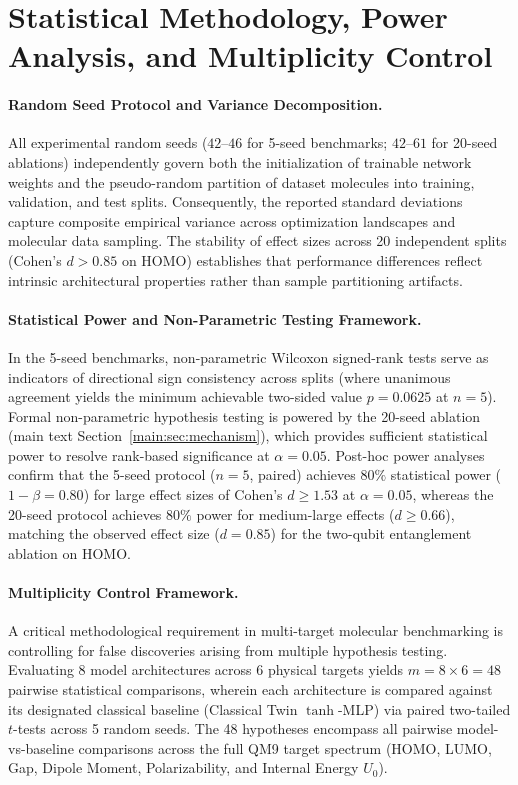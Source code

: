 \documentclass[10pt,twocolumn,letterpaper]{article}
\begin{document}
\section{Statistical Methodology, Power Analysis, and Multiplicity Control}
\label{sm:fdr}
\label{sm:seed_protocol}
\label{sec:sm_fdr_table}

\paragraph{Random Seed Protocol and Variance Decomposition.}
All experimental random seeds ($42$--$46$ for 5-seed benchmarks; $42$--$61$ for 20-seed ablations) independently govern both the initialization of trainable network weights and the pseudo-random partition of dataset molecules into training, validation, and test splits. Consequently, the reported standard deviations capture composite empirical variance across optimization landscapes and molecular data sampling. The stability of effect sizes across 20 independent splits (Cohen's $d > 0.85$ on HOMO) establishes that performance differences reflect intrinsic architectural properties rather than sample partitioning artifacts.

\paragraph{Statistical Power and Non-Parametric Testing Framework.}
In the 5-seed benchmarks, non-parametric Wilcoxon signed-rank tests serve as indicators of directional sign consistency across splits (where unanimous agreement yields the minimum achievable two-sided value $p = 0.0625$ at $n=5$). Formal non-parametric hypothesis testing is powered by the 20-seed ablation (main text Section~\ref{main:sec:mechanism}), which provides sufficient statistical power to resolve rank-based significance at $\alpha = 0.05$. Post-hoc power analyses confirm that the 5-seed protocol ($n = 5$, paired) achieves $80\%$ statistical power ($1-\beta = 0.80$) for large effect sizes of Cohen's $d \ge 1.53$ at $\alpha = 0.05$, whereas the 20-seed protocol achieves $80\%$ power for medium-large effects ($d \ge 0.66$), matching the observed effect size ($d = 0.85$) for the two-qubit entanglement ablation on HOMO.

\paragraph{Multiplicity Control Framework.}
A critical methodological requirement in multi-target molecular benchmarking is controlling for false discoveries arising from multiple hypothesis testing. Evaluating 8 model architectures across 6 physical targets yields $m = 8 \times 6 = 48$ pairwise statistical comparisons, wherein each architecture is compared against its designated classical baseline (Classical Twin $\tanh$-MLP) via paired two-tailed $t$-tests across 5 random seeds. The 48 hypotheses encompass all pairwise model-vs-baseline comparisons across the full QM9 target spectrum (HOMO, LUMO, Gap, Dipole Moment, Polarizability, and Internal Energy $U_0$).
\end{document}
